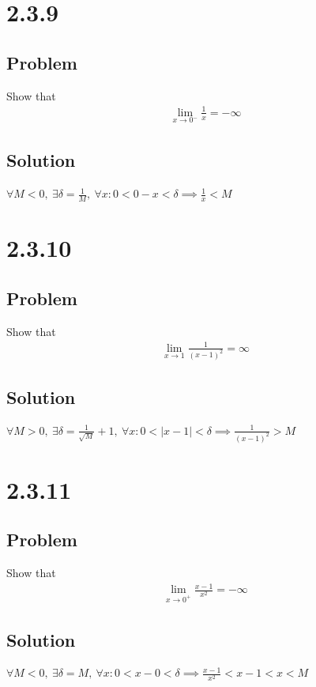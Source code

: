 \documentclass[12pt]{article}
\newcommand{\abs}  [1]{\left|       #1 \right|      }
\begin{document}
\section*{2.3.9}

\subsection*{Problem}
Show that
\begin{align*}
    \lim_{x \to 0^-} \frac{1}{x} = -\infty
\end{align*}

\subsection*{Solution}
$\forall M < 0,\ \exists \delta = \frac{1}{M},\ \forall x : 0 < 0 - x < \delta \implies \frac{1}{x} < M$



\section*{2.3.10}

\subsection*{Problem}
Show that
\begin{align*}
    \lim_{x \to 1} \frac{1}{(x - 1)^2} = \infty
\end{align*}

\subsection*{Solution}
$\forall M > 0,\ \exists \delta = \frac{1}{\sqrt{M}} + 1,\ \forall x : 0 < \abs{x - 1} < \delta \implies \frac{1}{(x - 1)^2} > M$



\section*{2.3.11}

\subsection*{Problem}
Show that
\begin{align*}
    \lim_{x \to 0^+} \frac{x - 1}{x^2} = -\infty
\end{align*}

\subsection*{Solution}
$\forall M < 0,\ \exists \delta = M,\ \forall x : 0 < x - 0 < \delta \implies \frac{x - 1}{x^2} < x - 1 < x < M$
\end{document}
